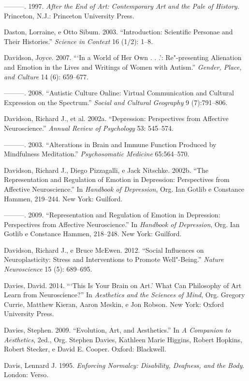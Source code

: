 ---------. 1997. \emph{After the End of Art: Contemporary Art and the
Pale of History}. Princeton, N.J.: Princeton University Press.

Daston, Lorraine, e Otto Sibum. 2003. ``Introduction: Scientific
Personae and Their Histories.'' \emph{Science in Context} 16 (1/2):
1--8.

Davidson, Joyce. 2007. ```In a World of Her Own . . .': Re"-presenting
Alienation and Emotion in the Lives and Writings of Women with Autism.''
\emph{Gender, Place, and Culture} 14 (6): 659--677.

---------. 2008. ``Autistic Culture Online: Virtual Communication and
Cultural Expression on the Spectrum.'' \emph{Social and Cultural
Geography} 9 (7):791--806.

Davidson, Richard J., et al. 2002a. ``Depression: Perspectives from
Affective Neuroscience.'' \emph{Annual Review of Psychology} 53:
545--574.

---------. 2003. ``Alterations in Brain and Immune Function Produced by
Mindfulness Meditation.'' \emph{Psychosomatic Medicine} 65:564--570.

Davidson, Richard J., Diego Pizzagalli, e Jack Nitschke. 2002b. ``The
Representation and Regulation of Emotion in Depression: Perspectives
from Affective Neuroscience.'' In \emph{Handbook of Depression}, Org.
Ian Gotlib e Constance Hammen, 219--244. New York: Guilford.

---------. 2009. ``Representation and Regulation of Emotion in
Depression: Perspectives from Affective Neuroscience.'' In
\emph{Handbook of Depression}, Org. Ian Gotlib e Constance Hammen,
218--248. New York: Guilford.

Davidson, Richard J., e Bruce McEwen. 2012. ``Social Influences on
Neuroplasticity: Stress and Interventions to Promote Well"-Being.''
\emph{Nature Neuroscience} 15 (5): 689--695.

Davies, David. 2014. ```This Is Your Brain on Art.' What Can Philosophy
of Art Learn from Neuroscience?'' In \emph{Aesthetics and the Sciences
of Mind}, Org. Gregory Currie, Matthew Kieran, Aaron Meskin, e Jon
Robson. New York: Oxford University Press.

Davies, Stephen. 2009. ``Evolution, Art, and Aesthetics.'' In \emph{A
Companion to Aesthetics}, 2ed., Org. Stephen Davies, Kathleen Marie
Higgins, Robert Hopkins, Robert Stecker, e David E. Cooper. Oxford:
Blackwell.

Davis, Lennard J. 1995. \emph{Enforcing Normalcy: Disability, Deafness,
and the Body}. London: Verso.


